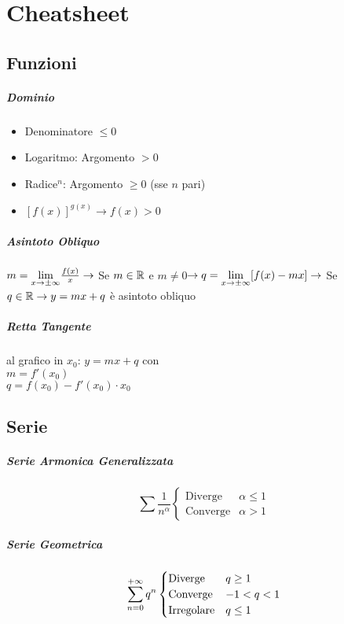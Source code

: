 \documentclass[12pt, a4paper, openany]{book}
\begin{document}
\chapter{Cheatsheet}
\section*{Funzioni}
\paragraph*{Dominio}
\begin{itemize}
	\item Denominatore $\leq 0$
	\item Logaritmo: Argomento $>0$
	\item Radice$^n$: Argomento $\geq 0$ (sse $n$ pari)
	\item $[f(x)]^{g(x)} \to f(x)>0$
\end{itemize}
\paragraph*{Asintoto Obliquo}
$m= \underset{x \to \pm \infty}{\lim} \frac{f(x)}{x} \rightarrow$ Se $m\in\mathbb{R}$ e $m\neq 0$$ \rightarrow q=\underset{x \to \pm \infty}{\lim} [f(x)-mx] \rightarrow$ Se $q\in\mathbb{R} \rightarrow y=mx+q$ è asintoto obliquo

\paragraph*{Retta Tangente} al grafico in $x_0$: $y=mx + q$ con
\\$m= f'(x_0)$
\\$q=f(x_0)-f'(x_0)\cdot x_0$


\section*{Serie}
\paragraph*{Serie Armonica Generalizzata}
\begin{equation*}
	\sum \frac{1}{n^\alpha} \begin{cases}
		\text{Diverge}  & \alpha\leq 1 \\
		\text{Converge} & \alpha> 1
	\end{cases}
\end{equation*}
\paragraph*{Serie Geometrica}
\begin{equation*}
	\sum_{n=0}^{+\infty} q^n \begin{cases}
		\text{Diverge}    & q\geq 1 \\
		\text{Converge}   & -1<q<1  \\
		\text{Irregolare} & q\leq 1
	\end{cases}
\end{equation*}
\end{document}

